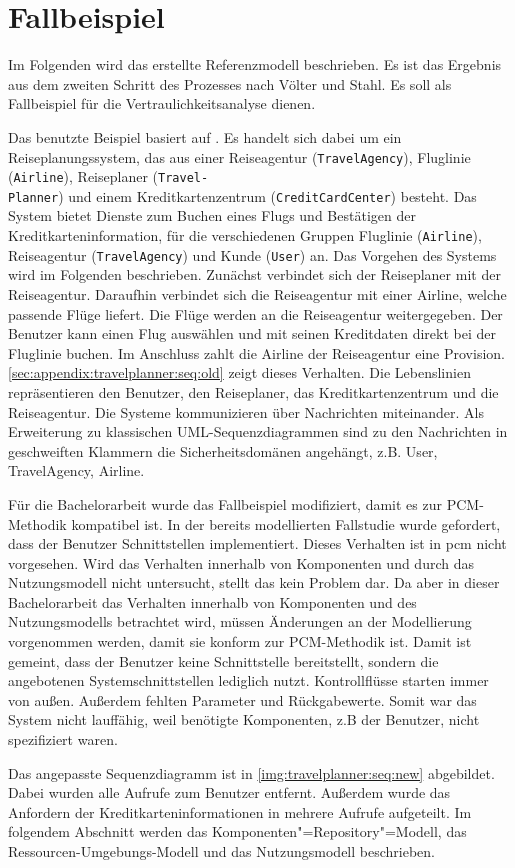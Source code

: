 \section{Fallbeispiel}
\label{sec:travelplanner}
Im Folgenden wird das erstellte Referenzmodell beschrieben. Es ist das Ergebnis aus dem zweiten Schritt des Prozesses nach Völter und Stahl. Es soll als Fallbeispiel für die Vertraulichkeitsanalyse dienen. \par
Das benutzte Beispiel basiert auf \cite{Stenzel2014}. Es handelt sich dabei um ein Reiseplanungssystem, das aus einer Reiseagentur (\texttt{TravelAgency}), Fluglinie (\texttt{Airline}), Reiseplaner (\texttt{Travel-\\Planner}) und einem Kreditkartenzentrum (\texttt{CreditCardCenter}) besteht. Das System bietet Dienste zum Buchen eines Flugs und Bestätigen der Kreditkarteninformation, für die verschiedenen Gruppen Fluglinie (\texttt{Airline}), Reiseagentur (\texttt{TravelAgency}) und Kunde (\texttt{User}) an. Das Vorgehen des Systems wird im Folgenden beschrieben. Zunächst verbindet sich der Reiseplaner mit der Reiseagentur. Daraufhin verbindet sich die Reiseagentur mit einer Airline, welche passende Flüge liefert. Die Flüge werden an die Reiseagentur weitergegeben. Der Benutzer kann einen Flug auswählen und mit seinen Kreditdaten direkt bei der Fluglinie buchen. Im Anschluss zahlt die Airline der Reiseagentur eine Provision. \autoref{sec:appendix:travelplanner:seq:old} zeigt dieses Verhalten. Die Lebenslinien repräsentieren den Benutzer, den Reiseplaner, das Kreditkartenzentrum und die Reiseagentur. Die Systeme kommunizieren über Nachrichten miteinander. Als Erweiterung zu klassischen UML-Sequenzdiagrammen sind zu den Nachrichten in geschweiften Klammern die Sicherheitsdomänen angehängt, z.B. {User, TravelAgency, Airline}. \par
Für die Bachelorarbeit wurde das Fallbeispiel modifiziert, damit es zur PCM-Methodik kompatibel ist. In der bereits modellierten Fallstudie wurde gefordert, dass der Benutzer Schnittstellen implementiert. Dieses Verhalten ist in \gls{pcm} nicht vorgesehen. Wird das Verhalten innerhalb von Komponenten und durch das Nutzungsmodell nicht untersucht, stellt das kein Problem dar. Da aber in dieser Bachelorarbeit das Verhalten innerhalb von Komponenten und des Nutzungsmodells betrachtet wird, müssen Änderungen an der Modellierung vorgenommen werden, damit sie konform zur PCM-Methodik ist. Damit ist gemeint, dass der Benutzer keine Schnittstelle bereitstellt, sondern die angebotenen Systemschnittstellen lediglich nutzt. Kontrollflüsse starten immer von außen. Außerdem fehlten Parameter und Rückgabewerte. Somit war das System nicht lauffähig, weil benötigte Komponenten, z.B der Benutzer, nicht spezifiziert waren. \par 
Das angepasste Sequenzdiagramm ist in \autoref{img:travelplanner:seq:new} abgebildet. Dabei wurden alle Aufrufe zum Benutzer entfernt.
Außerdem wurde das Anfordern der Kreditkarteninformationen in mehrere Aufrufe aufgeteilt. Im folgendem Abschnitt werden das Komponenten"=Repository"=Modell, das Ressourcen-Umgebungs-Modell und das Nutzungsmodell beschrieben.

